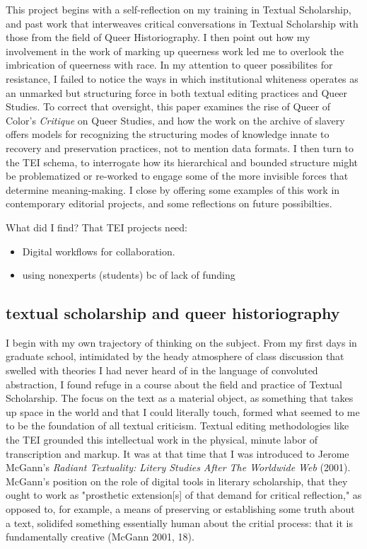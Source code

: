 \documentclass[11pt]{article}
\begin{document}
This project begins with a self-reflection on my training in Textual
Scholarship, and past work that interweaves critical conversations in
Textual Scholarship with those from the field of Queer
Historiography. I then point out how my involvement in the work of
marking up queerness work led me to overlook the imbrication of
queerness with race. In my attention to queer possibilites for
resistance, I failed to notice the ways in which institutional
whiteness operates as an unmarked but structuring force in both
textual editing practices and Queer Studies. To correct that
oversight, this paper examines the rise of Queer of Color's \emph{Critique}
on Queer Studies, and how the work on the archive of slavery offers
models for recognizing the structuring modes of knowledge innate to
recovery and preservation practices, not to mention data formats. I
then turn to the TEI schema, to interrogate how its hierarchical and
bounded structure might be problematized or re-worked to engage some
of the more invisible forces that determine meaning-making. I close by
offering some examples of this work in contemporary editorial
projects, and some reflections on future possibilties. 

What did I find? That TEI projects need:
\begin{itemize}
\item Digital workflows for collaboration.
\item using nonexperts (students) bc of lack of funding
\end{itemize}

\subsection{textual scholarship and queer historiography}
\label{sec:orgf6b1260}
I begin with my own trajectory of thinking on the subject. From my
first days in graduate school, intimidated by the heady atmosphere of
class discussion that swelled with theories I had never heard of in
the language of convoluted abstraction, I found refuge in a course
about the field and practice of Textual Scholarship. The focus on the
text as a material object, as something that takes up space in the
world and that I could literally touch, formed what seemed to me to be
the foundation of all textual criticism. Textual editing methodologies
like the TEI grounded this intellectual work in the physical, minute
labor of transcription and markup. It was at that time that I was
introduced to Jerome McGann's \emph{Radiant Textuality: Litery Studies
After The Worldwide Web} (2001). McGann's position on the role of
digital tools in literary scholarship, that they ought to work as
"prosthetic extension[s] of that demand for critical reflection," as
opposed to, for example, a means of preserving or establishing some
truth about a text, solidifed something essentially human about the
critial process: that it is fundamentally creative (McGann 2001, 18).
\end{document}
